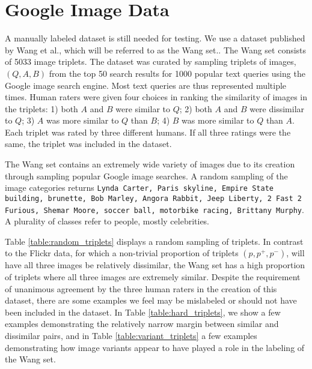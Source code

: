 \section{Google Image Data}
A manually labeled dataset is still needed for testing. We use a dataset published by Wang et al., which will be referred to as the Wang set.\cite{wang2014learning}. 
The Wang set consists of 5033 image triplets. The dataset was curated by sampling triplets of images, $(Q, A, B)$ from the top 50 search results for 1000 popular text queries using the Google image search engine. Most text queries are thus represented multiple times. Human raters were given four choices in ranking the similarity of images in the triplets: 1) both $A$ and $B$ were similar to $Q$; 2) both $A$ and $B$ were dissimilar to $Q$; 3) $A$ was more similar to $Q$ than $B$; 4) $B$ was more similar to $Q$ than $A$. Each triplet was rated by three different humans. If all three ratings were the same, the triplet was included in the dataset.

The Wang set contains an extremely wide variety of images due to its creation through sampling popular Google image searches. A random sampling of the image categories returns \texttt{\justify Lynda Carter, Paris skyline, Empire State building, brunette, Bob Marley, Angora Rabbit, Jeep Liberty, 2 Fast 2 Furious, Shemar Moore, soccer ball, motorbike racing, Brittany Murphy}. A plurality of classes refer to people, mostly celebrities.

Table \ref{table:random_triplets} displays a random sampling of triplets. In contrast to the Flickr data, for which a non-trivial proportion of triplets $(p, p^+, p^-)$, will have all three images be relatively dissimilar, the Wang set has a high proportion of triplets where all three images are extremely similar. Despite the requirement of unanimous agreement by the three human raters in the creation of this dataset, there are some examples we feel may be mislabeled or should not have been included in the dataset. In Table \ref{table:hard_triplets}, we show a few examples demonstrating the relatively narrow margin between similar and dissimilar pairs, and in Table \ref{table:variant_triplets} a few examples demonstrating how image variants appear to have played a role in the labeling of the Wang set.

